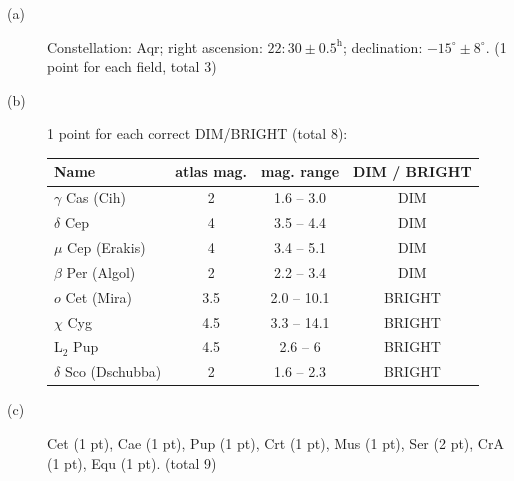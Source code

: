 \begin{description}
\item[(a)] Constellation: Aqr; right ascension:
  $22{:}30 \pm 0.5^{\mathrm{h}}$; declination: $-15^\circ \pm 8^\circ$.
  \hfill(1 point for each field, total 3)
\item[(b)] 1 point for each correct DIM/BRIGHT (total 8):

  \begin{center}
  \begin{tabular}{lccc}
  Name & atlas mag. & mag. range & DIM / BRIGHT \\
  \hline
  $\gamma$ Cas (Cih) & 2 & 1.6 -- 3.0 & DIM \\
  $\delta$ Cep & 4 & 3.5 -- 4.4 & DIM \\
  $\mu$ Cep (Erakis) & 4 & 3.4 -- 5.1 & DIM \\
  $\beta$ Per (Algol) & 2 & 2.2 -- 3.4 & DIM \\
  $o$ Cet (Mira) & 3.5 & 2.0 -- 10.1 & BRIGHT \\
  $\chi$ Cyg & 4.5 & 3.3 -- 14.1 & BRIGHT \\
  L$_2$ Pup & 4.5 & 2.6 -- 6 & BRIGHT \\
  $\delta$ Sco (Dschubba) & 2 & 1.6 -- 2.3 & BRIGHT \\
  \end{tabular}
  \end{center}
\item[(c)] Cet (1 pt), Cae (1 pt), Pup (1 pt), Crt (1 pt), Mus (1 pt),
  Ser (2 pt), CrA (1 pt), Equ (1 pt). \hfill(total 9)
\end{description}

